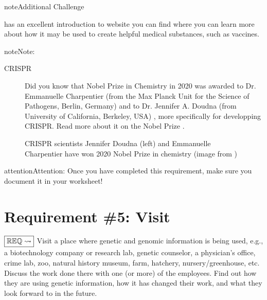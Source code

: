 \documentclass[letterpaper,10pt,english,openany,oneside]{sphinxmanual}
\let\sphinxpxdimen\pdfpxdimen\else\newdimen\sphinxpxdimen
\begin{document}
\begin{sphinxadmonition}{note}{Additional Challenge}

 has an excellent introduction to  website you can find  where you can learn more about how it may be used to create helpful medical substances, such as vaccines.
\end{sphinxadmonition}

\begin{sphinxadmonition}{note}{Note:}\begin{description}
\item[{CRISPR}] \leavevmode
Did you know that Nobel Prize in Chemistry in 2020 was awarded to Dr. Emmanuelle Charpentier (from the Max Planck Unit for the Science of Pathogens, Berlin, Germany) and to Dr. Jennifer A. Doudna (from University of California, Berkeley, USA) , more specifically for developping CRISPR. Read more about it on the Nobel Prize .

\end{description}

\begin{figure}[H]
\centering
\capstart

\noindent\sphinxincludegraphics[width=400\sphinxpxdimen]{{nobelchemistry2020}.jpg}
\caption{CRISPR scientists Jennifer Doudna (left) and Emmanuelle Charpentier have won 2020  Nobel Prize in chemistry (image from )}\label{\detokenize{requirement4:id2}}\end{figure}
\end{sphinxadmonition}

\begin{sphinxadmonition}{attention}{Attention:}
Once you have completed this requirement, make sure you document it in your worksheet!
\end{sphinxadmonition}


\chapter{Requirement \#5: Visit}
\label{\detokenize{requirement5:requirement-5-visit}}\label{\detokenize{requirement5::doc}}
\(\boxed{\mathbb{REQ}\Large \rightsquigarrow}\) Visit a place where genetic and genomic information is being used, e.g., a biotechnology company or research lab, genetic counselor, a physician’s office, crime lab, zoo, natural history museum, farm, hatchery, nursery/greenhouse, etc. Discuss the work done there with one (or more) of the employees. Find out how they are using genetic information, how it has changed their work, and what they look forward to in the future.
\end{document}
